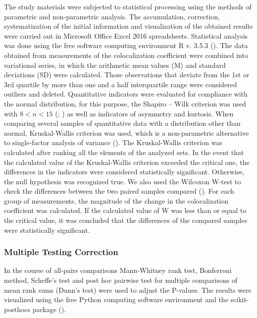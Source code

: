 \documentclass[english,authoryear]{elsarticle}
\begin{document}
The study materials were subjected to statistical processing using the methods of parametric and non-parametric analysis.
The accumulation, correction, systematization of the initial information and visualization of the obtained results were carried out in Microsoft Office Excel 2016 spreadsheets.
Statistical analysis was done using the free software computing environment R v. 3.5.3 (\cite{team2014r}).
The data obtained from measurements of the colocalization coefficient were combined into variational series, in which the arithmetic mean values (M) and standard deviations (SD) were calculated.
Those observations that deviate from the 1st or 3rd quartile by more than one and a half interquartile range were considered outliers and deleted.
Quantitative indicators were evaluated for compliance with the normal distribution, for this purpose, the Shapiro – Wilk criterion  was used with $8 < n < 15$ (\cite{shapiro1965analysis}; \cite{shapiro1972approximate}) as well as indicators of asymmetry and kurtosis.
When comparing several samples of quantitative data with a distribution other than normal, Kruskal-Wallis criterion was used, which is a non-parametric alternative to single-factor analysis of variance (\cite{kruskal1952use}).
The Kruskal-Wallis criterion was calculated after ranking all the elements of the analyzed sets.
In the event that the calculated value of the Kruskal-Wallis criterion exceeded the critical one, the differences in the indicators were considered statistically significant.
Otherwise, the null hypothesis was recognized true.
We also used the Wilcoxon W-test to check the differences between the two paired samples compared (\cite{wilcoxon1992individual}).
For each group of measurements, the magnitude of the change in the colocalization coefficient was calculated.
If the calculated value of W was less than or equal to the critical value, it was concluded that the differences of the compared samples were statistically significant.

\subsubsection{Multiple Testing Correction}

In the course of all-pairs comparisons Mann-Whitney rank test, Bonferroni method, Scheffe’s test and post hoc pairwise test for multiple comparisons of mean rank sums (Dunn’s test) were used to adjust the P-values. The results were visualized using the free Python computing software environment and the scikit-posthocs package (\cite{Terpilowski2019}).
\end{document}
